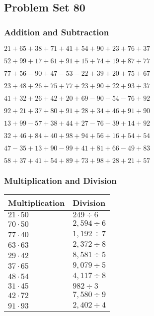 \hypertarget{problem-set-80}{%
\subsection{Problem Set 80}\label{problem-set-80}}

\hypertarget{addition-and-subtraction}{%
\subsubsection{Addition and
Subtraction}\label{addition-and-subtraction}}

\(21+65+38+71+41+54+90+23+76+37\)

\(52+99+17+61+91+15+74+19+87+77\)

\(77+56-90+47-53-22+39+20+75+67\)

\(23+48+26+75+77+23+90+22+93+37\)

\(41+32+26+42+20+69-90-54-76+92\)

\(92+21+37+80+91+28+34+46+91+90\)

\(13+99-57+38+44+27-76-39+14+92\)

\(32+46+84+40+98+94+56+16+54+54\)

\(47-35+13+90-99+41+81+66-49+83\)

\(58+37+41+54+89+73+98+28+21+57\)

\hypertarget{multiplication-and-division}{%
\subsubsection{Multiplication and
Division}\label{multiplication-and-division}}

\begin{longtable}[]{@{}ll@{}}
\toprule
Multiplication & Division\tabularnewline
\midrule
\endhead
\(21\cdot50\) & \(249÷6\)\tabularnewline
\(70\cdot50\) & \(2,594÷6\)\tabularnewline
\(77\cdot40\) & \(1,192÷7\)\tabularnewline
\(63\cdot63\) & \(2,372÷8\)\tabularnewline
\(29\cdot42\) & \(8,581÷5\)\tabularnewline
\(37\cdot65\) & \(9,079÷5\)\tabularnewline
\(48\cdot54\) & \(4,117 ÷8\)\tabularnewline
\(31\cdot45\) & \(982÷3\)\tabularnewline
\(42\cdot72\) & \(7,580÷9\)\tabularnewline
\(91\cdot93\) & \(2,402÷4\)\tabularnewline
\bottomrule
\end{longtable}
